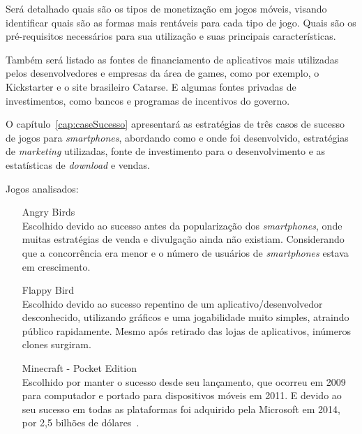 Será detalhado quais são os tipos de monetização em jogos móveis, visando identificar quais são as formas mais rentáveis para cada tipo de jogo. Quais são os pré-requisitos necessários para sua utilização e suas principais características.


Também será listado as fontes de financiamento de aplicativos mais utilizadas pelos desenvolvedores e empresas da área de games, como por exemplo, o Kickstarter\cite{kickstarter} e o site brasileiro Catarse\cite{catarse}. E algumas fontes privadas de investimentos, como bancos e programas de incentivos do governo.






O capítulo~\ref{cap:caseSucesso} apresentará as estratégias de três casos de sucesso de jogos para \emph{smartphones}, abordando como e onde foi desenvolvido, estratégias de \emph{marketing} utilizadas, fonte de investimento para o desenvolvimento e as estatísticas de \emph{download} e vendas.\newline

Jogos analisados:

\begin{itemize}

	\item [Angry Birds~\cite{angrybirds} \cite{LTI-Lib}] \hfill \\
		Escolhido devido ao sucesso antes da popularização dos \emph{smartphones}, onde muitas estratégias de venda e divulgação ainda não existiam. Considerando que a concorrência era menor e o número de usuários de \emph{smartphones} estava em crescimento.

	\item [Flappy Bird~\cite{flappybird}] \hfill \\
		Escolhido devido ao sucesso repentino de um aplicativo/desenvolvedor desconhecido, utilizando gráficos e uma jogabilidade muito simples, atraindo público rapidamente. Mesmo após retirado das lojas de aplicativos, inúmeros clones surgiram.

	\item [Minecraft - Pocket Edition~\cite{minecraft}] \hfill \\
		Escolhido por manter o sucesso desde seu lançamento, que ocorreu em 2009 para computador e portado para dispositivos móveis em 2011. E devido ao seu sucesso em todas as plataformas foi adquirido pela Microsoft em 2014, por 2,5 bilhões de dólares~\cite{minecraft-bought}.
	
	

\end{itemize}





